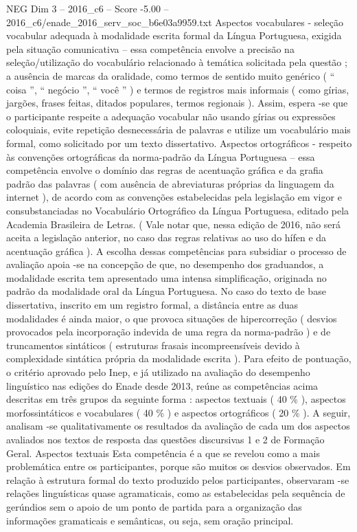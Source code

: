 \begin{textsample}{NEG Dim 3 – 2016\_c6 – Score -5.00 – 2016\_c6/enade\_2016\_serv\_soc\_b6e03a9959.txt}
Aspectos vocabulares - seleção vocabular adequada à modalidade escrita formal da Língua Portuguesa, exigida pela situação comunicativa – essa competência envolve a precisão na seleção/utilização do vocabulário relacionado à temática solicitada pela questão ; a ausência de marcas da oralidade, como termos de sentido muito genérico ( “ coisa ”, “ negócio ”, “ você ” ) e termos de registros mais informais ( como gírias, jargões, frases feitas, ditados populares, termos regionais ).
Assim, espera -se que o participante respeite a adequação vocabular não usando gírias ou expressões coloquiais, evite repetição desnecessária de palavras e utilize um vocabulário mais formal, como solicitado por um texto dissertativo.
Aspectos ortográficos - respeito às convenções ortográficas da norma-padrão da Língua Portuguesa – essa competência envolve o domínio das regras de acentuação gráfica e da grafia padrão das palavras ( com ausência de abreviaturas próprias da linguagem da internet ), de acordo com as convenções estabelecidas pela legislação em vigor e consubstanciadas no Vocabulário Ortográfico da Língua Portuguesa, editado pela Academia Brasileira de Letras. ( Vale notar que, nessa edição de 2016, não será aceita a legislação anterior, no caso das regras relativas ao uso do hífen e da acentuação gráfica ).
A escolha dessas competências para subsidiar o processo de avaliação apoia -se na concepção de que, no desempenho dos graduandos, a modalidade escrita tem apresentado uma intensa simplificação, originada no padrão da modalidade oral da Língua Portuguesa.
No caso do texto de base dissertativa, inscrito em um registro formal, a distância entre as duas modalidades é ainda maior, o que provoca situações de hipercorreção ( desvios provocados pela incorporação indevida de uma regra da norma-padrão ) e de truncamentos sintáticos ( estruturas frasais incompreensíveis devido à complexidade sintática própria da modalidade escrita ).
Para efeito de pontuação, o critério aprovado pelo Inep, e já utilizado na avaliação do desempenho linguístico nas edições do Enade desde 2013, reúne as competências acima descritas em três grupos da seguinte forma : aspectos textuais ( 40 \% ), aspectos morfossintáticos e vocabulares ( 40 \% ) e aspectos ortográficos ( 20 \% ).
A seguir, analisam -se qualitativamente os resultados da avaliação de cada um dos aspectos avaliados nos textos de resposta das questões discursivas 1 e 2 de Formação Geral.
Aspectos textuais Esta competência é a que se revelou como a mais problemática entre os participantes, porque são muitos os desvios observados.
Em relação à estrutura formal do texto produzido pelos participantes, observaram -se relações linguísticas quase agramaticais, como as estabelecidas pela sequência de gerúndios sem o apoio de um ponto de partida para a organização das informações gramaticais e semânticas, ou seja, sem oração principal.

\end{textsample}

